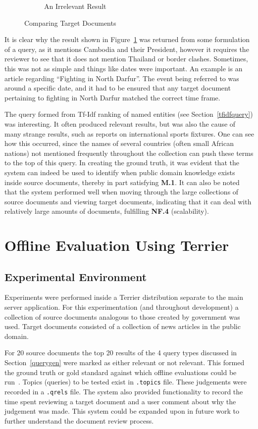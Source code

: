 \documentclass{l4proj}
\newcommand{\code}[1]{\texttt{#1}}
\begin{document}
\begin{figure}[H]
\begin{subfigure}{.5\textwidth}
  \caption{An Irrelevant Result}
  \label{irrelevant_result}
\end{subfigure}
\caption{Comparing Target Documents}
\label{fig:comparingtargetdocs}
\end{figure}
It is clear why the result shown in Figure~\ref{irrelevant_result} was returned from some formulation of a query, as it mentions Cambodia and their President, however it requires the reviewer to see that it does not mention Thailand or border clashes. Sometimes, this was not as simple and things like dates were important. An example is an article regarding ``Fighting in North Darfur''. The event being referred to was around a specific date, and it had to be ensured that any target document pertaining to fighting in North Darfur matched the correct time frame.

The query formed from Tf-Idf ranking of named entities (see Section~\ref{tfidfquery}) was interesting. It often produced relevant results, but was also the cause of many strange results, such as reports on international sports fixtures. One can see how this occurred, since the names of several countries (often small African nations) not mentioned frequently throughout the collection can push these terms to the top of this query.
In creating the ground truth, it was evident that the system can indeed be used to identify when public domain knowledge exists inside source documents, thereby in part satisfying \textbf{M.1}. It can also be noted that the system performed well when moving through the large collections of source documents and viewing target documents, indicating that it can deal with relatively large amounts of documents, fulfilling \textbf{NF.4} (scalability).

\section{Offline Evaluation Using Terrier}\label{offlineevaluation}
\subsection{Experimental Environment}
Experiments were performed inside a Terrier distribution separate to the main server application. For this experimentation (and throughout development) a collection of source documents analogous to those created by government was used. Target documents consisted of a collection of news articles in the public domain.

For 20 source documents the top 20 results of the 4 query types discussed in Section~\ref{querygen} were marked as either relevant or not relevant. This formed the ground truth or gold standard against which offline evaluations could be run~\cite{Manning:2008:IIR:1394399}. Topics (queries) to be tested exist in \code{.topics} file. These judgements were recorded in a \code{.qrels} file. The system also provided functionality to record the time spent reviewing a target document and a user comment about why the judgement was made. This system could be expanded upon in future work to further understand the document review process.
\end{document}
